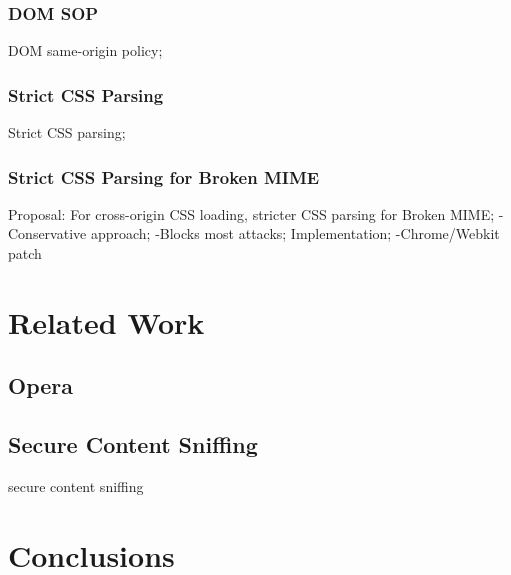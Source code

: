\documentclass{acm_proc_article-sp}
\begin{document}
\subsubsection{DOM SOP}
DOM same-origin policy;

\subsubsection{Strict CSS Parsing}
Strict CSS parsing;

\subsubsection{Strict CSS Parsing for Broken MIME}
Proposal: For cross-origin CSS loading, stricter CSS parsing for Broken MIME;
-Conservative approach;
-Blocks most attacks;
Implementation;
-Chrome/Webkit patch

\section{Related Work}

\subsection{Opera}

\subsection{Secure Content Sniffing}
secure content sniffing\cite{securecontentsniffing}

\section{Conclusions}




\end{document}
